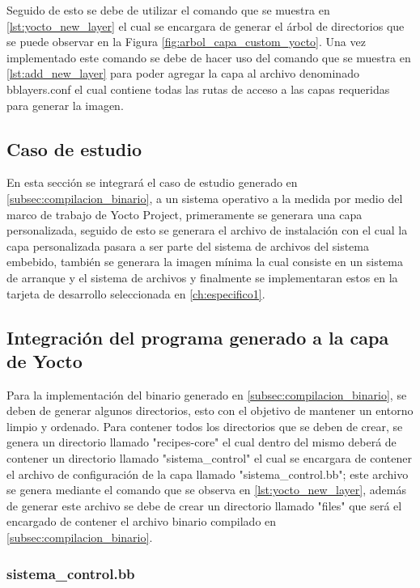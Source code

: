 Seguido de esto se debe de utilizar el comando que se muestra en \ref{lst:yocto_new_layer} el cual se encargara de generar el árbol de directorios que se puede observar en la Figura \ref{fig:arbol_capa_custom_yocto}. Una vez implementado este comando se debe de hacer uso del comando que se muestra en \ref{lst:add_new_layer} para poder agregar la capa al archivo denominado bblayers.conf el cual contiene todas las rutas de acceso a las capas requeridas para generar la imagen.

\subsection{Caso de estudio}

En esta sección se integrará el caso de estudio generado en \ref{subsec:compilacion_binario}, a un sistema operativo a la medida por medio del marco de trabajo de Yocto Project, primeramente se generara una capa personalizada, seguido de esto se generara el archivo de instalación con el cual la capa personalizada pasara a ser parte del sistema de archivos del sistema embebido, también se generara la imagen mínima la cual consiste en un sistema de arranque y el sistema de archivos y finalmente se implementaran estos en la tarjeta de desarrollo seleccionada en \ref{ch:especifico1}.

\subsection{Integración del programa generado a la capa de Yocto}

Para la implementación del binario generado en \ref{subsec:compilacion_binario}, se deben de generar algunos directorios, esto con el objetivo de mantener un entorno limpio y ordenado. Para contener todos los directorios que se deben de crear, se genera un directorio llamado "recipes-core" el cual dentro del mismo deberá de contener un directorio llamado "sistema\_control" el cual se encargara de contener el archivo de configuración de la capa llamado "sistema\_control.bb"; este archivo se genera mediante el comando que se observa en \ref{lst:yocto_new_layer}, además de generar este archivo se debe de crear un directorio llamado "files" que será el encargado de contener el archivo binario compilado en \ref{subsec:compilacion_binario}.

\subsubsection{sistema\_control.bb}

